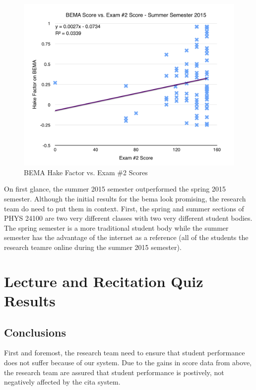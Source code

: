 \begin{figure}[!htb]
	\centering
	\includegraphics[width=6in]{img/chapter4/bema_vs_ex2_su15}
	\caption[BEMA Hake Factor vs. Exam \#2 Scores]{BEMA Hake Factor vs. Exam \#2 Scores}
  \label{fig:bemaVsExTwoSu15}
\end{figure}

On first glance, the summer 2015 semester outperformed the spring 2015 semester. Although the initial results for the \gls{bema} look promising, the research team do need to put them in context. First, the spring and summer sections of PHYS 24100 are two very different classes with two very different student bodies. The spring semester is a more traditional student body while the summer semester has the advantage of the internet as a reference (all of the students the research teamre online during the summer 2015 semester).

\section{Lecture and Recitation Quiz Results}



\subsection{Conclusions}

First and foremost, the research team need to ensure that student performance does not suffer because of our system. Due to the gains in score data from above, the research team are assured that student performance is postively, not negatively affected by the \gls{cita} system.

